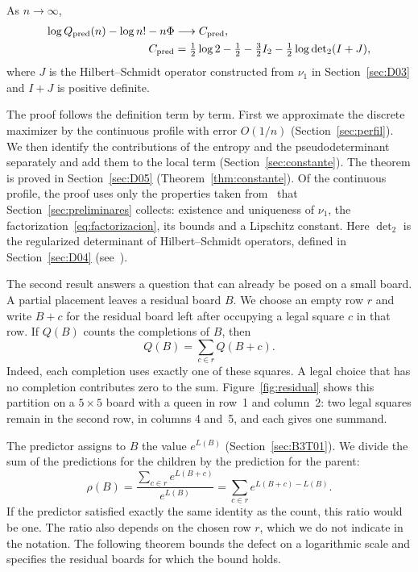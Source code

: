 \begin{teorema}\label{thm:intro-constante}
As $n\to\infty$,
\[
\begin{aligned}
 \log Q_{\rm pred}(n)-\log n!-n\Phi &\longrightarrow C_{\rm pred},\\
 C_{\rm pred} &=\tfrac12\log2-\tfrac12-\tfrac32I_2-\tfrac12\log{\det}_2(I+J),
\end{aligned}
\]
where $J$ is the Hilbert--Schmidt operator constructed from $\nu_1$ in Section~\ref{sec:D03} and
$I+J$ is positive definite.
\end{teorema}

The proof follows the definition term by term. First we approximate the discrete maximizer by the
continuous profile with error $O(1/n)$ (Section~\ref{sec:perfil}). We then identify the contributions of the
entropy and the pseudodeterminant separately and add them to the local term
(Section~\ref{sec:constante}). The theorem is proved in Section~\ref{sec:D05} (Theorem~\ref{thm:constante}).
Of the continuous profile, the proof uses only the properties taken from~\cite{Perfil} that
Section~\ref{sec:preliminares} collects: existence and uniqueness of $\nu_1$, the
factorization~\eqref{eq:factorizacion}, its bounds and a Lipschitz constant. Here $\det_2$ is the
regularized determinant of Hilbert--Schmidt operators, defined in Section~\ref{sec:D04}
(see~\cite[Ch.~9]{Simon}).

The second result answers a question that can already be posed on a small board.
A partial placement leaves a residual board $B$. We choose an empty row $r$ and write
$B+c$ for the residual board left after occupying a legal square $c$ in that row.
If $Q(B)$ counts the completions of $B$, then
\[
 Q(B)=\sum_{c\in r} Q(B+c).
\]
Indeed, each completion uses exactly one of these squares. A legal choice that has no completion
contributes zero to the sum. Figure~\ref{fig:residual} shows this partition on a $5\times5$ board with a
queen in
row~1 and column~2: two legal squares remain in the second row, in columns 4 and~5, and each gives one
summand.



The predictor assigns to $B$ the value $e^{L(B)}$ (Section~\ref{sec:B3T01}).
We divide the sum of the predictions for the children by the prediction for the parent:
\[
 \rho(B)=\frac{\sum_{c\in r}e^{L(B+c)}}{e^{L(B)}}
        =\sum_{c\in r}e^{L(B+c)-L(B)} .
\]
If the predictor satisfied exactly the same identity as the count, this ratio would be one.
The ratio also depends on the chosen row $r$, which we do not indicate in the notation.
The following theorem bounds the defect on a logarithmic scale and specifies the residual boards for which
the bound holds.

